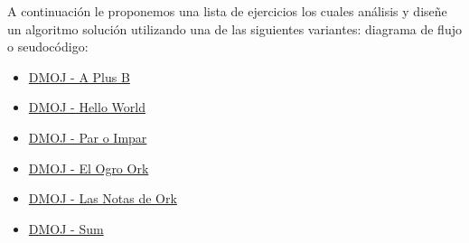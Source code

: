A continuación le proponemos una lista de ejercicios los cuales análisis y diseñe un algoritmo solución utilizando una de las siguientes variantes: diagrama de flujo o seudocódigo:

\begin{itemize}
	\item \href{https://dmoj.uclv.edu.cu/problem/aplusb}{DMOJ - A Plus B}
	\item \href{https://dmoj.uclv.edu.cu/problem/hello}{DMOJ - Hello World}
	\item \href{https://dmoj.uclv.edu.cu/problem/evenodd}{DMOJ - Par o Impar}
	\item \href{https://dmoj.uclv.edu.cu/problem/ogroork}{DMOJ - El Ogro Ork}
	\item \href{https://dmoj.uclv.edu.cu/problem/notasork}{DMOJ - Las Notas de Ork}
	\item \href{https://dmoj.uclv.edu.cu/problem/sum}{DMOJ - Sum}
\end{itemize}